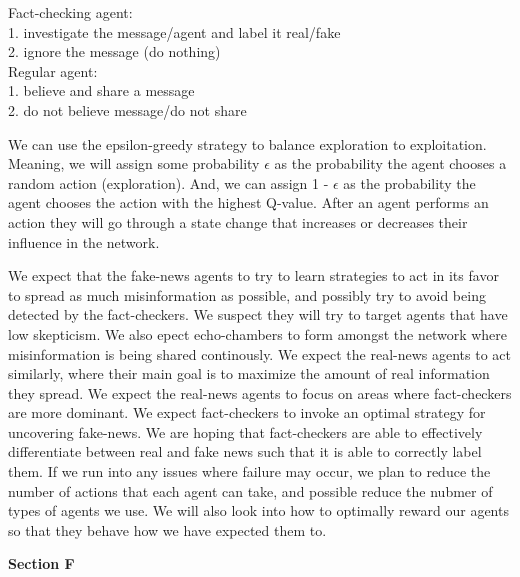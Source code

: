 \documentclass[twoside]{article}
\begin{document}
Fact-checking agent:\\
1. investigate the message/agent and label it real/fake\\
2. ignore the message (do nothing)\\

Regular agent:\\
1. believe and share a message\\
2. do not believe message/do not share

We can use the epsilon-greedy strategy to balance exploration to exploitation. Meaning, we will assign some probability 
$\epsilon$
 as the probability the agent chooses a random action (exploration). And, we can assign 1 - $\epsilon$
 as the probability the agent chooses the action with the highest Q-value. After an agent performs an action they will go through a state change that increases or decreases their influence in the network.

We expect that the fake-news agents to try to learn strategies to act in its favor to spread as much misinformation as possible, and possibly try to avoid being detected by the fact-checkers. We suspect they will try to target agents that have low skepticism. We also epect echo-chambers to form amongst the network where misinformation is being shared continously. We expect the real-news agents to act similarly, where their main goal is to maximize the amount of real information they spread. We expect the real-news agents to focus on areas where fact-checkers are more dominant. We expect fact-checkers to invoke an optimal strategy for uncovering fake-news. We are hoping that fact-checkers are able to effectively differentiate between real and fake news such that it is able to correctly label them. If we run into any issues where failure may occur, we plan to reduce the number of actions that each agent can take, and possible reduce the nubmer of types of agents we use. We will also look into how to optimally reward our agents so that they behave how we have expected them to.

\textbf{Section F}
\end{document}
